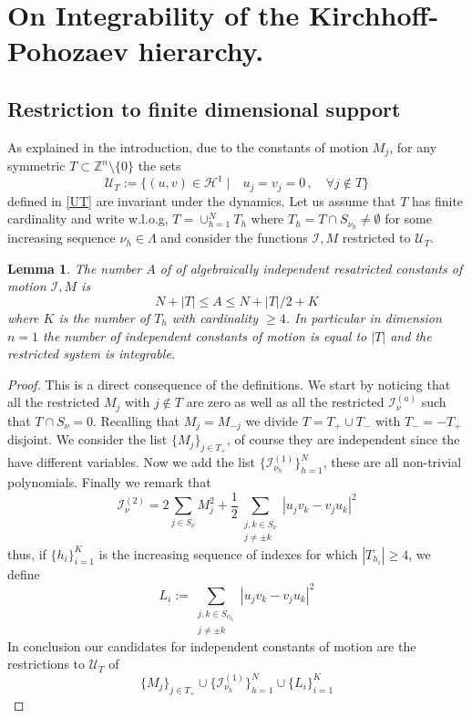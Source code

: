 \documentclass[reqno,11pt]{amsart}
\theoremstyle{plain}
\numberwithin{equation}{section}
\newtheorem{lemma}[theorem]{Lemma}
\newcommand{\Z}{\mathbb{Z}}
\renewcommand{\H}{\mathcal{H}}
\newcommand{\cI}{{\mathcal I}}
\begin{document}
{\section{On Integrability of the Kirchhoff-Pohozaev hierarchy.}
\subsection{Restriction to finite dimensional support}
As explained in the introduction, due to the constants of motion $M_j$, for any symmetric $T\subset \Z^n\setminus\{0\}$ the sets
\[
\mathscr{U}_T:=\{(u,v)\in \H^1 \;\vert{} \quad u_j=v_j=0 \,,\quad \forall j\notin T \}
\]
defined in \eqref{UT} are invariant under the dynamics. Let us assume that $T$ has finite cardinality and write w.l.o.g, $T=\cup_{h=1}^N T_h$ where $T_h= T\cap S_{\nu_h}\neq \emptyset$ for some  increasing sequence $\nu_h\in \Lambda$ and consider the functions $\cI,M$ restricted to $\mathscr{U}_T$.
\begin{lemma}\label{restringo}
	The number $A$ of of algebraically independent  resatricted constants of motion $\cI,M$ is 
	\[
	N+|T|\leq A\leq N + |T|/2 + K 
	\]
	where $K$ is the number of $T_h$ with cardinality $\geq 4$. In particular in dimension $n=1$ the number of independent constants of motion is equal to $|T|$ and the restricted system is integrable. 
\end{lemma}
\begin{proof}
	This is a direct consequence of the definitions. We start by noticing that all the restricted $M_j$ with $j\notin T$  are zero as well as all the restricted $\cI^{(a)}_{\nu}$ such that $T\cap S_{\nu}=0$. Recalling that $M_j=M_{-j}$ we divide 
	$T= T_+\cup T_{-}$ with $T_{-}=-T_{+}$ disjoint.  We 
	consider  the list $\{M_j\}_{j\in T_+}$, of course they are independent since the have different variables. Now we add the list $\{\cI^{(1)}_{\nu_h}\}_{h=1}^N$, these are all non-trivial polynomials. Finally we remark that
	\[
	\cI_{\nu}^{(2)}= 2\sum_{j\in S_\nu} M_j^2 + \frac12 \sum_{\substack{j,k\in S_\nu\\ j\neq \pm k}}|u_j v_k -v_j u_k|^2
	\]
	thus, if $\{h_i\}_{i=1}^K$ is the increasing sequence  of indexes for which $|T_{h_i}|\geq 4$, we define $$L_i:= \sum_{\substack{j,k\in S_{\nu_{h_i}}\\ j\neq \pm k}}|u_j v_k -v_j u_k|^2$$
	In conclusion our candidates for independent constants of motion are the restrictions to $\mathscr{U}_T$ of
	\begin{equation}
		\label{costantine}
		\{M_j\}_{j\in T_+}\cup\{\cI^{(1)}_{\nu_h}\}_{h=1}^N\cup  \{ L_i \}_{i=1}^K

\end{equation}
\end{proof}}
\end{document}
